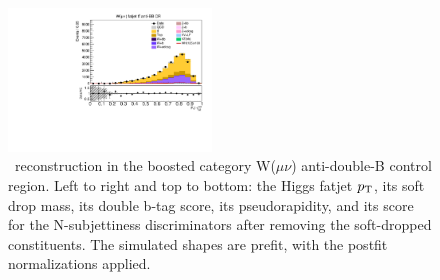 \begin{figure}[tbp]
\begin{center}
    \includegraphics[width=0.48\textwidth]{figures/wlnhbb2016/boosted/WmnWHTT1bFJCR_fj1Tau32SD.pdf}
    \caption{\HBB\ reconstruction in the boosted category W($\mu\nu$) anti-double-B control region.
    Left to right and top to bottom: the Higgs fatjet $p_{\mathrm{T}}$, its soft drop mass, its
    double b-tag score, its pseudorapidity, and its score for the N-subjettiness discriminators
    after removing the soft-dropped constituents.
    The simulated shapes are prefit, with the postfit normalizations applied.}
    \label{fig:boost_WmnTT1b_Hbb}
  \end{center}
\end{figure}
\clearpage


